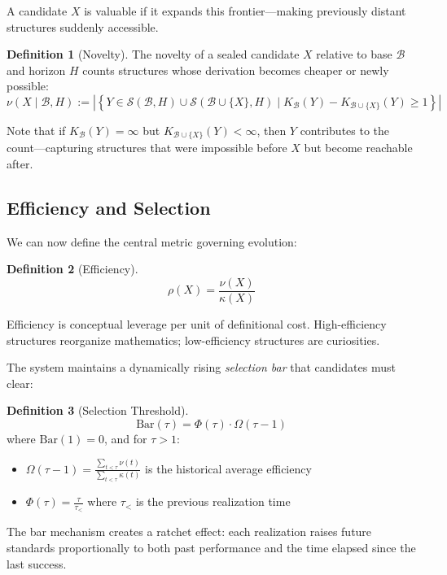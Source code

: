 \documentclass[11pt]{article}
\theoremstyle{definition}
\newtheorem{definition}{Definition}
\theoremstyle{plain}
\theoremstyle{remark}
\begin{document}
A candidate $X$ is valuable if it expands this frontier—making previously distant structures suddenly accessible.

\begin{definition}[Novelty]
The novelty of a sealed candidate $X$ relative to base $\mathcal{B}$ and horizon $H$ counts structures whose derivation becomes cheaper or newly possible:
\[
\nu(X \mid \mathcal{B}, H) := \left|\left\{Y \in \mathcal{S}(\mathcal{B}, H) \cup \mathcal{S}(\mathcal{B} \cup \{X\}, H) \mid K_{\mathcal{B}}(Y) - K_{\mathcal{B}\cup\{X\}}(Y) \geq 1\right\}\right|
\]
\end{definition}

Note that if $K_{\mathcal{B}}(Y) = \infty$ but $K_{\mathcal{B}\cup\{X\}}(Y) < \infty$, then $Y$ contributes to the count—capturing structures that were impossible before $X$ but become reachable after.

\subsection{Efficiency and Selection}

We can now define the central metric governing evolution:

\begin{definition}[Efficiency]
\[
\rho(X) = \frac{\nu(X)}{\kappa(X)}
\]
\end{definition}

Efficiency is conceptual leverage per unit of definitional cost. High-efficiency structures reorganize mathematics; low-efficiency structures are curiosities.

The system maintains a dynamically rising \emph{selection bar} that candidates must clear:

\begin{definition}[Selection Threshold]
\[
\text{Bar}(\tau) = \Phi(\tau) \cdot \Omega(\tau - 1)
\]
where $\text{Bar}(1) = 0$, and for $\tau > 1$:
\begin{itemize}
\item $\Omega(\tau - 1) = \frac{\sum_{t<\tau} \nu(t)}{\sum_{t<\tau} \kappa(t)}$ is the historical average efficiency
\item $\Phi(\tau) = \frac{\tau}{\tau_<}$ where $\tau_<$ is the previous realization time
\end{itemize}
\end{definition}

The bar mechanism creates a ratchet effect: each realization raises future standards proportionally to both past performance and the time elapsed since the last success.
\end{document}
